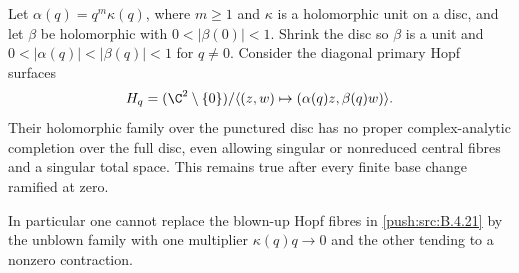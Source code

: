 \begin{proposition}\hypertarget{tag-030U}{}\label{push:src:B.4.25}
\label{push:B425}

Let $\alpha(q)=q^m\kappa(q)$, where $m\ge1$ and
$\kappa$ is a holomorphic unit on a disc, and let $\beta$
be holomorphic with $0<|\beta(0)|<1$. Shrink the disc so
$\beta$ is a unit and $0<|\alpha(q)|<|\beta(q)|<1$ for
$q\ne0$. Consider the diagonal primary Hopf surfaces
\begin{equation}
 H_q=(\C^2\setminus\{0\})/
       \langle(z,w)\mapsto(\alpha(q)z,\beta(q)w)\rangle.
\label{pub:I:eq:B-4-25-1}
\end{equation}
Their holomorphic family over the punctured disc has no
proper complex-analytic completion over the full disc,
even allowing singular or nonreduced central fibres and
a singular total space. This remains true after every
finite base change ramified at zero.

In particular one cannot replace the blown-up Hopf
fibres in \ref{push:src:B.4.21} by the unblown family with one multiplier
$\kappa(q)q\to0$ and the other tending to a nonzero
contraction.
\end{proposition}


